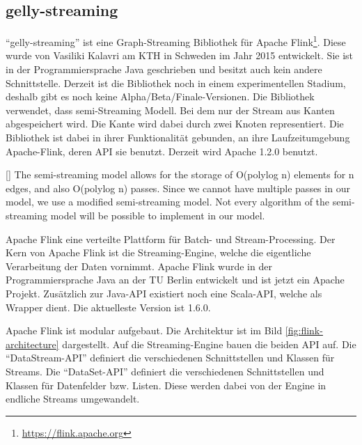 \subsection{gelly-streaming}
\enquote{gelly-streaming} ist eine Graph-Streaming Bibliothek für Apache Flink\footnote{\url{https://flink.apache.org}}.
Diese wurde von Vasiliki Kalavri am KTH in Schweden im Jahr 2015 entwickelt.
Sie ist in der Programmiersprache Java geschrieben und besitzt auch kein andere
Schnittstelle. Derzeit ist die Bibliothek noch in einem experimentellen Stadium,
deshalb gibt es noch keine Alpha/Beta/Finale-Versionen. Die Bibliothek verwendet,
dass semi-Streaming Modell. Bei dem nur der Stream aus Kanten abgespeichert wird.
Die Kante wird dabei durch zwei Knoten representiert. Die Bibliothek ist dabei
in ihrer Funktionalität gebunden, an ihre Laufzeitumgebung
Apache-Flink, deren \gls{API} sie benutzt. Derzeit wird Apache 1.2.0 benutzt.

[\cite{Bali2015}]{
The semi-streaming model allows for the storage of O(polylog n) elements for n
edges, and also O(polylog n) passes. Since we cannot have multiple passes in our
model, we use a modified semi-streaming model. Not every algorithm of the
semi-streaming model will be possible to implement in our model.
}

Apache Flink eine verteilte Plattform für Batch- und Stream-Processing. Der Kern
von Apache Flink ist die Streaming-Engine, welche die eigentliche Verarbeitung
der Daten vornimmt. Apache Flink wurde in der Programmiersprache Java an der TU
Berlin entwickelt und ist jetzt ein Apache Projekt. Zusätzlich zur Java-\gls{API}
existiert noch eine Scala-\gls{API}, welche als Wrapper dient. Die aktuelleste
Version ist 1.6.0. 

Apache Flink ist modular aufgebaut. Die Architektur ist im Bild \ref{fig:flink-architecture}
dargestellt. Auf die Streaming-Engine bauen die beiden \gls{API} auf.
Die \enquote{DataStream-API} definiert die verschiedenen Schnittstellen und Klassen
für Streams. Die \enquote{DataSet-API} definiert die verschiedenen Schnittstellen
und Klassen für Datenfelder bzw. Listen. Diese werden dabei von der Engine in
endliche Streams umgewandelt.

